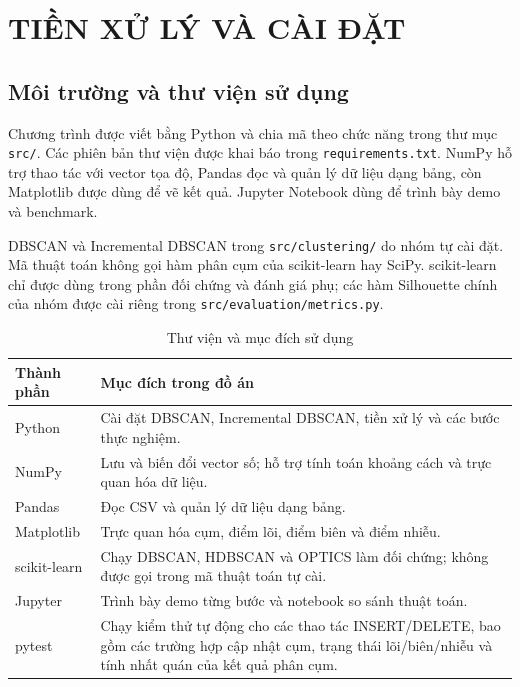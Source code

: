 \chapter{TIỀN XỬ LÝ VÀ CÀI ĐẶT}

\section{Môi trường và thư viện sử dụng}

Chương trình được viết bằng Python và chia mã theo chức năng trong thư mục \texttt{src/}. Các phiên bản thư viện được khai báo trong \texttt{requirements.txt}. NumPy hỗ trợ thao tác với vector tọa độ, Pandas đọc và quản lý dữ liệu dạng bảng, còn Matplotlib được dùng để vẽ kết quả. Jupyter Notebook dùng để trình bày demo và benchmark.

DBSCAN và Incremental DBSCAN trong \texttt{src/clustering/} do nhóm tự cài đặt. Mã thuật toán không gọi hàm phân cụm của scikit-learn hay SciPy. scikit-learn chỉ được dùng trong phần đối chứng và đánh giá phụ; các hàm Silhouette chính của nhóm được cài riêng trong \texttt{src/evaluation/metrics.py}.

\begin{table}[H]
\centering
\caption{Thư viện và mục đích sử dụng}
\label{tab:environment_libraries}
\begin{tabularx}{\textwidth}{|P{3.2cm}|Y|}\hline
\textbf{Thành phần} & \textbf{Mục đích trong đồ án} \\\hline
Python & Cài đặt DBSCAN, Incremental DBSCAN, tiền xử lý và các bước thực nghiệm. \\\hline
NumPy & Lưu và biến đổi vector số; hỗ trợ tính toán khoảng cách và trực quan hóa dữ liệu. \\\hline
Pandas & Đọc CSV và quản lý dữ liệu dạng bảng. \\\hline
Matplotlib & Trực quan hóa cụm, điểm lõi, điểm biên và điểm nhiễu. \\\hline
scikit-learn & Chạy DBSCAN, HDBSCAN và OPTICS làm đối chứng; không được gọi trong mã thuật toán tự cài. \\\hline
Jupyter & Trình bày demo từng bước và notebook so sánh thuật toán. \\\hline
pytest & Chạy kiểm thử tự động cho các thao tác INSERT/DELETE, bao gồm các trường hợp cập nhật cụm, trạng thái lõi/biên/nhiễu và tính nhất quán của kết quả phân cụm. \\\hline
\end{tabularx}
\end{table}

